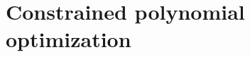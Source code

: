\documentclass[11pt]{article}
\numberwithin{theorem}{section}
\theoremstyle{definition}
\newtheorem{example}[theorem]{Example}
\newcommand{\ip}[2]{\langle #1 , #2\rangle}
\newcommand{\I}{\mathds{1}}
\newcommand{\real}{\mathbb{R}}
\newcommand\V{\mathcal{V}}
\newcommand\Sp{\mathcal{S}}
\DeclareMathOperator{\spn}{span}
\def\ba#1\ea{\begin{align}#1\end{align}}
\begin{document}
%


\section{Constrained polynomial optimization}\label{constraints}
\end{document}
